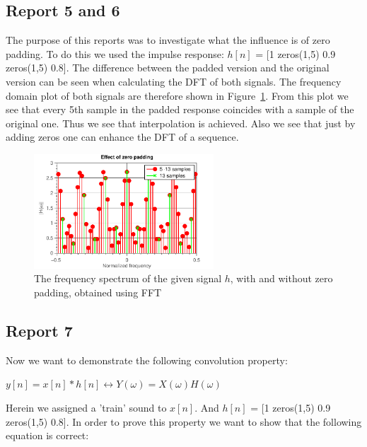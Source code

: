 \documentclass[11pt,titlepage]{report}
\begin{document}
\subsection{Report 5 and 6}

The purpose of this reports was to investigate what the influence is of zero padding. To do this we used the impulse response: $h[n]$ = [1  zeros(1,5)  0.9 zeros(1,5)  0.8]. 
The difference between the padded version and the original version can be seen when calculating the DFT of both signals. The frequency domain plot of both signals are therefore shown in Figure~\ref{fig:rep5-6-spectrum}. 
From this plot we see that every 5th sample in the padded response coincides with a sample of the original one. Thus we see that interpolation is achieved. Also we see that just by adding zeros one can enhance the DFT of a sequence. 

\begin{figure}[H]
	\centering
	\includegraphics[width=0.6\textwidth]{../../deliverable-7-resources/figures/ass-1/report-5-6/ass-1-report-5-6.pdf}
	\caption{The frequency spectrum of the given signal $h$, with and without zero padding, obtained using FFT}
	\label{fig:rep5-6-spectrum}
\end{figure}


\subsection{Report 7}
Now we want to demonstrate the following convolution property: \newline

\begin{center}
 $y[n] = x[n]*h[n] \leftrightarrow Y(\omega) = X(\omega)H(\omega)$ 
\end{center}


Herein we assigned a 'train' sound to  $x[n]$.  And  $h[n]$ = [1  zeros(1,5)  0.9 zeros(1,5)  0.8].
In order to prove this property we want to show that the following equation is correct: \newline
\end{document}
